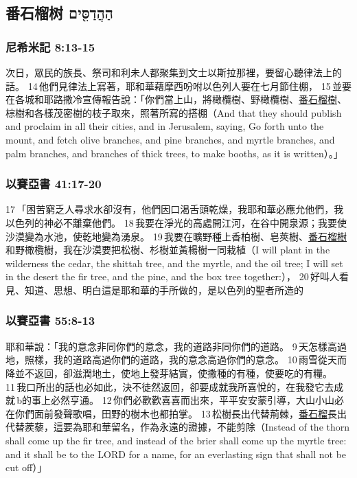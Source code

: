\subsection{番石榴树  הַהֲדַסִּ֖ים }
\subsubsection{尼希米記 8:13-15}
次日，眾民的族長、祭司和利未人都聚集到文士以斯拉那裡，要留心聽律法上的話。 14 他們見律法上寫著，耶和華藉摩西吩咐以色列人要在七月節住棚， 15 並要在各城和耶路撒冷宣傳報告說：「你們當上山，將橄欖樹、野橄欖樹、\underline{番石榴樹}、棕樹和各樣茂密樹的枝子取來，照著所寫的搭棚（And that they should publish and proclaim in all their cities, and in Jerusalem, saying, Go forth unto the mount, and fetch olive branches, and pine branches, and myrtle branches, and palm branches, and branches of thick trees, to make booths, as it is written）。」

\subsubsection{以賽亞書 41:17-20}
17 「困苦窮乏人尋求水卻沒有，他們因口渴舌頭乾燥，我耶和華必應允他們，我以色列的神必不離棄他們。 18 我要在淨光的高處開江河，在谷中開泉源；我要使沙漠變為水池，使乾地變為湧泉。 19 我要在曠野種上香柏樹、皂莢樹、\underline{番石榴樹}和野橄欖樹，我在沙漠要把松樹、杉樹並黃楊樹一同栽植（I will plant in the wilderness the cedar, the shittah tree, and the myrtle, and the oil tree; I will set in the desert the fir tree, and the pine, and the box tree together:）， 20 好叫人看見、知道、思想、明白這是耶和華的手所做的，是以色列的聖者所造的

\subsubsection{以賽亞書 55:8-13}
耶和華說：「我的意念非同你們的意念，我的道路非同你們的道路。 9 天怎樣高過地，照樣，我的道路高過你們的道路，我的意念高過你們的意念。 10 雨雪從天而降並不返回，卻滋潤地土，使地上發芽結實，使撒種的有種，使要吃的有糧。 11 我口所出的話也必如此，決不徒然返回，卻要成就我所喜悅的，在我發它去成就 b的事上必然亨通。 12 你們必歡歡喜喜而出來，平平安安蒙引導，大山小山必在你們面前發聲歌唱，田野的樹木也都拍掌。 13 松樹長出代替荊棘，\underline{番石榴}長出代替蒺藜，這要為耶和華留名，作為永遠的證據，不能剪除（Instead of the thorn shall come up the fir tree, and instead of the brier shall come up the myrtle tree: and it shall be to the LORD for a name, for an everlasting sign that shall not be cut off）」


